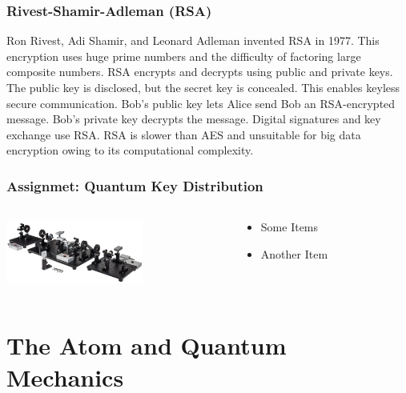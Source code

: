 \documentclass{beamer}
\begin{document}
\begin{frame}\frametitle{Rivest-Shamir-Adleman (RSA)}

Ron Rivest, Adi Shamir, and Leonard Adleman invented RSA in 1977. This encryption uses huge prime numbers and the difficulty of factoring large composite numbers. RSA encrypts and decrypts using public and private keys. The public key is disclosed, but the secret key is concealed. This enables keyless secure communication. Bob's public key lets Alice send Bob an RSA-encrypted message. Bob's private key decrypts the message. Digital signatures and key exchange use RSA. RSA is slower than AES and unsuitable for big data encryption owing to its computational complexity.
\end{frame}

\begin{frame}\frametitle{Assignmet: Quantum Key Distribution}
\begin{columns}
\begin{column}{4.5cm}
\begin{center}
\includegraphics[width=4.5cm]{fig/ThorQKD.jpg}
\end{center}
\end{column}
\begin{column}{7cm}
\begin{itemize}
\item Some Items
\item Another Item
\end{itemize}
\end{column}
\end{columns}
\end{frame}

\section{The Atom and Quantum Mechanics}
\end{document}
